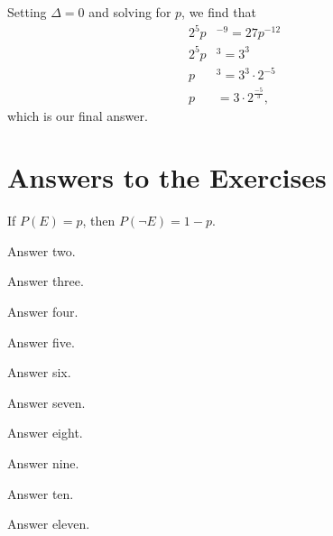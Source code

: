\documentclass{book}
\begin{document}
Setting $\Delta = 0$ and solving for $p$, we find that
\begin{align*}
2^5p&^{-9} = 27p^{-12}\\
2^5p&^3 = 3^3\\
p&^3 = 3^3\cdot 2^{-5}\\
p& = 3\cdot 2^{\frac{-5}{3}},
\end{align*}
which is our final answer.
\appendix
\chapter{Answers to the Exercises}\label{answers}
\renewcommand{\thechapter}{\arabic{chapter}}
\begin{answer}
If $P(E) = p$, then $P(\neg E) = 1 - p$.
\end{answer}

\begin{answer}%
  Answer two.
\end{answer}

\begin{answer}%
  Answer three.
\end{answer}

\begin{answer}%
  Answer four.
\end{answer}

\begin{answer}%
  Answer five.
\end{answer}

\begin{answer}%
  Answer six.
\end{answer}

\begin{answer}%
  Answer seven.
\end{answer}

\begin{answer}%
  Answer eight.
\end{answer}

\begin{answer}%
  Answer nine.
\end{answer}

\begin{answer}%
  Answer ten.
\end{answer}

\begin{answer}%
  Answer eleven.
\end{answer}
\end{document}
